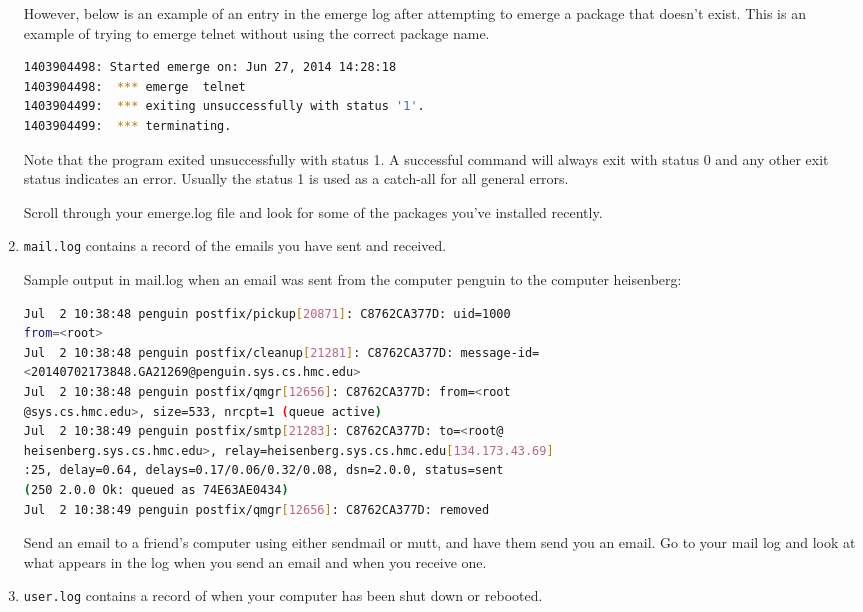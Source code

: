\documentclass{article}
\begin{document}
\begin{enumerate}
However, below is an example of an entry in the emerge log after attempting to emerge a package that doesn't exist. This is an example of trying to emerge telnet without using the correct package name.

\begin{lstlisting}[basicstyle=\ttfamily, backgroundcolor = \color{lightgray}, language = bash, xleftmargin = 0cm, framexleftmargin = 1em]
1403904498: Started emerge on: Jun 27, 2014 14:28:18
1403904498:  *** emerge  telnet
1403904499:  *** exiting unsuccessfully with status '1'.
1403904499:  *** terminating.
\end{lstlisting}

Note that the program exited unsuccessfully with status 1. A successful command will always exit with status 0 and any other exit status indicates an error. Usually the status 1 is used as a catch-all for all general errors.

Scroll through your emerge.log file and look for some of the packages you've installed recently.

\item \verb|mail.log| contains a record of the emails you have sent and received.

Sample output in mail.log when an email was sent from the computer penguin to the computer heisenberg:
\begin{lstlisting}[basicstyle=\ttfamily, backgroundcolor = \color{lightgray}, language = bash, xleftmargin = 0cm, framexleftmargin = 1em]
Jul  2 10:38:48 penguin postfix/pickup[20871]: C8762CA377D: uid=1000 
from=<root>
Jul  2 10:38:48 penguin postfix/cleanup[21281]: C8762CA377D: message-id=
<20140702173848.GA21269@penguin.sys.cs.hmc.edu>
Jul  2 10:38:48 penguin postfix/qmgr[12656]: C8762CA377D: from=<root
@sys.cs.hmc.edu>, size=533, nrcpt=1 (queue active)
Jul  2 10:38:49 penguin postfix/smtp[21283]: C8762CA377D: to=<root@
heisenberg.sys.cs.hmc.edu>, relay=heisenberg.sys.cs.hmc.edu[134.173.43.69]
:25, delay=0.64, delays=0.17/0.06/0.32/0.08, dsn=2.0.0, status=sent 
(250 2.0.0 Ok: queued as 74E63AE0434)
Jul  2 10:38:49 penguin postfix/qmgr[12656]: C8762CA377D: removed
\end{lstlisting}

Send an email to a friend's computer using either sendmail or mutt, and have them send you an email. Go to your mail log and look at what appears in the log when you send an email and when you receive one.

\item \verb|user.log| contains a record of when your computer has been shut down or rebooted.

\end{enumerate}
\end{document}
